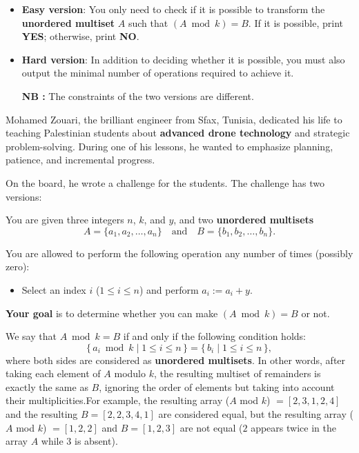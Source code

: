\begin{itemize}
  \item \textbf{Easy version}: You only need to check if it is possible to transform the \textbf{unordered multiset} $A$ such that $(A \bmod k) = B$. If it is possible, print \textbf{YES}; otherwise, print \textbf{NO}.
  \item \textbf{Hard version}: In addition to deciding whether it is possible, you must also output the minimal number of operations required to achieve it. 

\textbf{NB : } The constraints of the two versions are different.
\end{itemize}


Mohamed Zouari, the brilliant engineer from Sfax, Tunisia, dedicated his life to teaching Palestinian students about \textbf{advanced drone technology} and strategic problem-solving. During one of his lessons, he wanted to emphasize planning, patience, and incremental progress.

On the board, he wrote a challenge for the students. The challenge has two versions:


You are given three integers $n$, $k$, and $y$, and two \textbf{unordered multisets}
$$A = \{a_1, a_2, \dots, a_n\}\quad\text{and}\quad B = \{b_1, b_2, \dots, b_n\}.$$

You are allowed to perform the following operation any number of times (possibly zero):
\begin{itemize}
  \item Select an index $i$ ($1 \le i \le n$) and perform $a_i := a_i + y$.
\end{itemize}

\textbf{Your goal} is to determine whether you can  make $(A \bmod k) = B$ or not.

We say that $A \bmod k = B$ if and only if the following condition holds:
$$
\{\, a_i \bmod k \mid 1 \le i \le n \,\}
=
\{\, b_i \mid 1 \le i \le n \,\},
$$
where both sides are considered as \textbf{unordered multisets}. In other words, after taking each element of $A$ modulo $k$, the resulting multiset of remainders is exactly the same as $B$, ignoring the order of elements but taking into account their multiplicities.For example, the resulting array ($A$ mod $k$) $= [2,3,1,2,4]$ and the resulting $B = [2,2,3,4,1]$ are considered equal, but the resulting array ($A$ mod $k$) $= [1,2,2]$ and $ B =[1,2,3]$  are not equal ($2$ appears twice in the array $A$ while $3$ is absent).